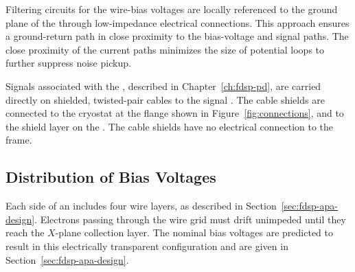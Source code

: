 Filtering circuits for the  wire-bias voltages are 
locally referenced to the ground plane of the  
through low-impedance electrical connections. This approach 
ensures a ground-return path in close proximity to the 
bias-voltage and signal paths. The close proximity of the 
current paths minimizes the size of potential loops to further 
suppress noise pickup.

Signals associated with the , described in 
Chapter~\ref{ch:fdsp-pd}, are carried directly on shielded, 
twisted-pair cables to the signal \fdth. The cable shields 
are connected to the cryostat at the  flange 
shown in Figure~\ref{fig:connections}, and to the  
shield layer on the . The cable shields have no 
electrical connection to the  frame.

\subsection{Distribution of Bias Voltages}
\label{sec:fdsp-tpcelec-design-bias}


Each side of an  includes four wire layers, as 
described in Section~\ref{sec:fdsp-apa-design}. Electrons passing 
through the wire grid must drift unimpeded until they reach 
the $X$-plane collection layer. The nominal bias voltages are 
predicted to result in this electrically transparent configuration 
and are given in Section~\ref{sec:fdsp-apa-design}. 

